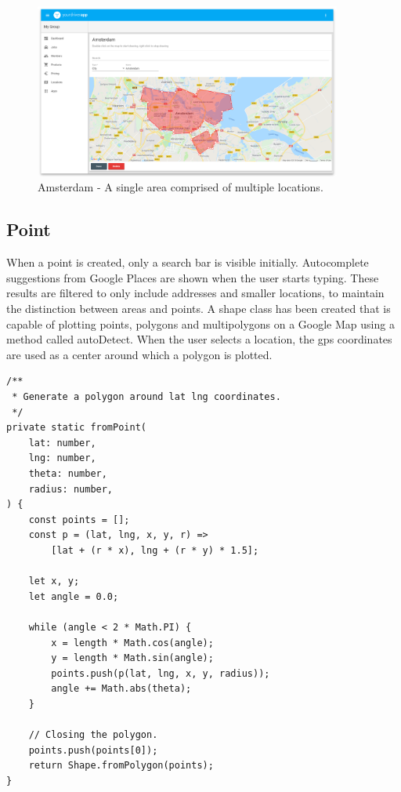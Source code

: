 \begin{figure}[H]
	\centering
	\includegraphics[width=0.9\textwidth]{Amsterdam}
	\caption[Amsterdam Drawn Polygon]{Amsterdam - A single area comprised of multiple locations.}
	\label{fig:Amsterdam Drawn Polygon Realization}
\end{figure}

\subsection{Point}
When a point is created, only a search bar is visible initially. Autocomplete suggestions from Google Places are shown when the user starts typing. These results are filtered to only include addresses and smaller locations, to maintain the distinction between areas and points. A shape class has been created that is capable of plotting points, polygons and multipolygons on a Google Map using a method called autoDetect. When the user selects a location, the gps coordinates are used as a center around which a polygon is plotted.

\begin{center}
\noindent\begin{minipage}{.85\textwidth}
\begin{lstlisting}[caption={Generating Polygon From Point.}, label={lst:Generating Polygon From Point}]
/**
 * Generate a polygon around lat lng coordinates.
 */
private static fromPoint(
	lat: number,
	lng: number,
	theta: number,
	radius: number,
) {
	const points = [];
	const p = (lat, lng, x, y, r) =>
		[lat + (r * x), lng + (r * y) * 1.5];

	let x, y;
	let angle = 0.0;

	while (angle < 2 * Math.PI) {
		x = length * Math.cos(angle);
		y = length * Math.sin(angle);
		points.push(p(lat, lng, x, y, radius));
		angle += Math.abs(theta);
	}

	// Closing the polygon.
	points.push(points[0]);
	return Shape.fromPolygon(points);
}
\end{lstlisting}
\end{minipage}
\end{center}


